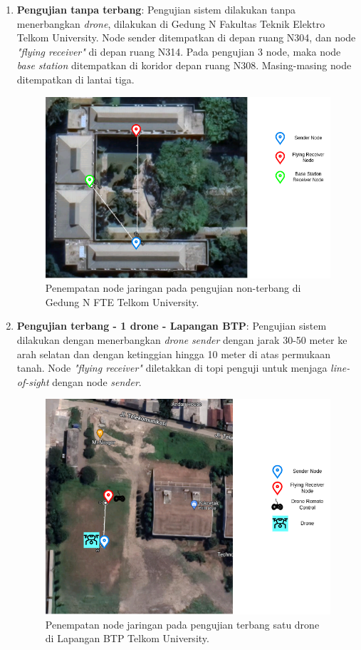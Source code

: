 \begin{enumerate}
	\item \textbf{Pengujian tanpa terbang}: Pengujian sistem dilakukan tanpa menerbangkan \textit{drone}, dilakukan di Gedung N Fakultas Teknik Elektro Telkom University. Node sender ditempatkan di depan ruang N304, dan node \textit{"flying receiver"} di depan ruang N314. Pada pengujian 3 node, maka node \textit{base station} ditempatkan di koridor depan ruang N308. Masing-masing node ditempatkan di lantai tiga.
	\begin{figure}[H]
		\centering
		\includegraphics[scale=0.5]{./assets/PetaNonTerbangN}
		\caption{Penempatan node jaringan pada pengujian non-terbang di Gedung N FTE Telkom University.}
	\end{figure}

	\item \textbf{Pengujian terbang - 1 drone - Lapangan BTP}: Pengujian sistem dilakukan dengan menerbangkan \textit{drone} \textit{sender} dengan jarak 30-50 meter ke arah selatan dan dengan ketinggian hingga 10 meter di atas permukaan tanah. Node \textit{"flying receiver"} diletakkan di topi penguji untuk menjaga \textit{line-of-sight} dengan node \textit{sender}.
	\begin{figure}[H]
		\centering
		\includegraphics[scale=0.5]{./assets/PetaTerbangSatuBTP}
		\caption{Penempatan node jaringan pada pengujian terbang satu drone di Lapangan BTP Telkom University.}
	\end{figure}


\end{enumerate}
